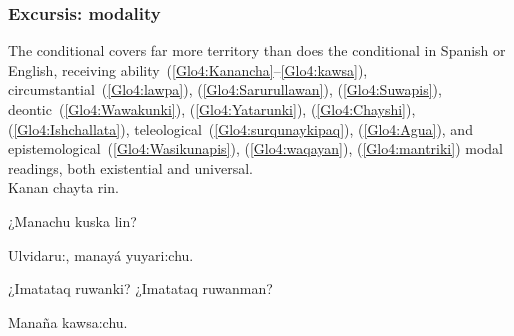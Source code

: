 \subsubsection{Excursis: modality}\label{ssec:modality}
The \SYQ{} conditional covers far more territory than does the conditional in Spanish or English, receiving ability~(\ref{Glo4:Kanancha}--\ref{Glo4:kawsa}), circumstantial~(\ref{Glo4:lawpa}), (\ref{Glo4:Sarurullawan}), (\ref{Glo4:Suwapis}), deontic~(\ref{Glo4:Wawakunki}), (\ref{Glo4:Yatarunki}), (\ref{Glo4:Chayshi}), (\ref{Glo4:Ishchallata}), teleological~(\ref{Glo4:surqunaykipaq}), (\ref{Glo4:Agua}), and epistemological~(\ref{Glo4:Wasikunapis}), (\ref{Glo4:waqayan}), (\ref{Glo4:mantriki}) modal readings, both existential and universal.\\

%
{Kanan chayta rin.}%
{}%
{}{}%

%
{¿Manachu kuska lin?}%
{}%
{}{}%

%
{Ulvidaru:, manayá yuyari:chu.}%
{}%
{}{}%

%
{¿Imatataq ruwanki? ¿Imatataq ruwanman?}%
{}%
{}{}%

%
{Manaña kawsa:chu.}%
{}%
{}{}%

